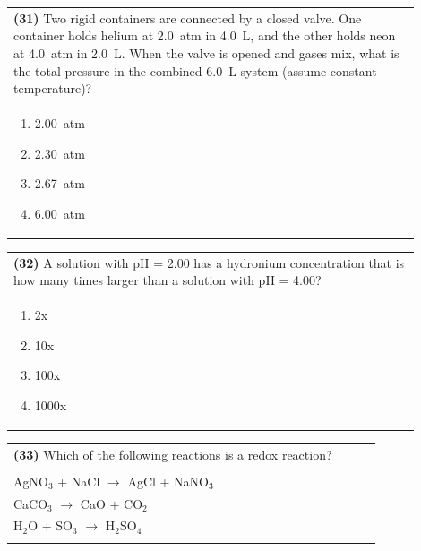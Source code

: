 \documentclass{article}
\begin{document}
\noindent\begin{tabular}{|p{0.9\linewidth}|}
\hline
\textbf{(31)} Two rigid containers are connected by a closed valve. One container holds helium at 2.0~atm in 4.0~L, and the other holds neon at 4.0~atm in 2.0~L. When the valve is opened and gases mix, what is the total pressure in the combined 6.0~L system (assume constant temperature)?\\[0.2cm]
\begin{minipage}[t]{0.85\linewidth}
\begin{enumerate}[label=\alph*.]
\item 2.00~atm
\item 2.30~atm
\item 2.67~atm
\item 6.00~atm
\end{enumerate}
\end{minipage}\\[0.2cm]
\hline
\end{tabular}

\noindent\begin{tabular}{|p{0.9\linewidth}|}
\hline
\textbf{(32)} A solution with pH = 2.00 has a hydronium concentration that is how many times larger than a solution with pH = 4.00? \\[0.2cm]
\begin{minipage}{0.85\linewidth}
\begin{enumerate}[label=\alph*.]
\item 2x \item 10x \item 100x \item 1000x
\end{enumerate}
\end{minipage}\\[0.2cm]
\hline
\end{tabular}

\noindent\begin{tabular}{|p{0.9\linewidth}|}
\hline
\textbf{(33)} Which of the following reactions is a redox reaction?\\[0.2cm]
\begin{minipage}[t]{0.85\linewidth}
\begin{enumerate}[label=\alph*.]
\item Zn + CuSO$_4$ $\rightarrow$ ZnSO$_4$ + Cu\\[0.1cm]
\item AgNO$_3$ + NaCl $\rightarrow$ AgCl + NaNO$_3$\\[0.1cm]
\item CaCO$_3$ $\rightarrow$ CaO + CO$_2$\\[0.1cm]
\item H$_2$O + SO$_3$ $\rightarrow$ H$_2$SO$_4$\\[0.1cm]
\end{enumerate}
\end{minipage}\\[0.2cm]
\hline
\end{tabular}
\end{document}
